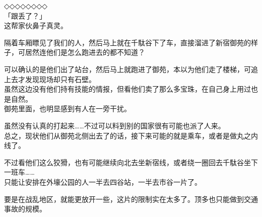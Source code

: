 ◇◇◇◇◇◇◇◇\\

「跟丢了？」\\

这帮家伙鼻子真灵。

隔着车厢瞟见了我们的人，然后马上就在千駄谷下了车，直接溜进了新宿御苑的样子，可居然连他们是怎么跑进去的都不知道？

可以确认的是他们出了站台，然后马上就跑进了御苑，本以为他们走了楼梯，可追上去才发现现场却只有石壁。\\

虽然这边没有他们持有技能的情报，但看他们卖了那么多宝珠，在自己身上用过也是自然。\\

御苑里面，也明显感到有人在一旁干扰。

虽然没有认真的打起来……不过可以料到别的国家很有可能也派了人来。\\

总之，现状他们从御苑北侧出去了的话，接下来可能的就是乘车，或者是做丸之内线了。

不过看他们这么狡猾，也有可能继续向北去坐新宿线，或者绕一圈回去千駄谷坐下一班车……\\

只能让安排在外壕公园的人一半去四谷站，一半去市谷一片了。

要是在战乱地区，就能更放开一些，这片的限制实在太多了。顶多也只能做到交通事故的规模。\\

